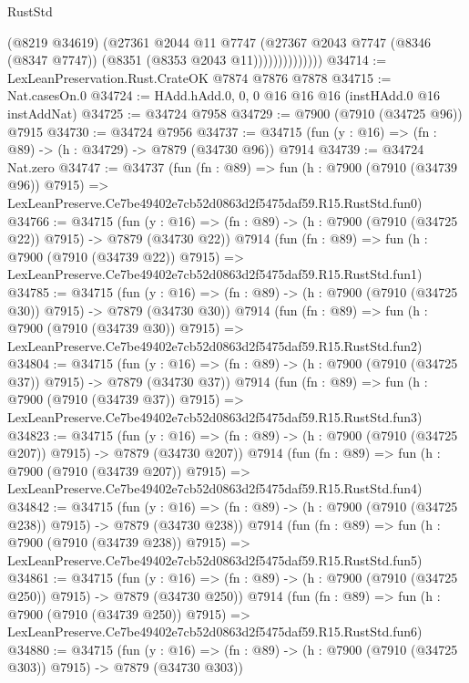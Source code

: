 \begin{lexlean}{RustStd}
\begin{coremodule}
                        (@8219 @34619)
                        (@27361
                          @2044
                          @11
                          @7747
                          (@27367
                            @2043
                            @7747
                            (@8346 (@8347 @7747))
                            (@8351 (@8353 @2043 @11))))))))))))))
@34714 := LexLeanPreservation.Rust.CrateOK @7874 @7876 @7878
@34715 := Nat.casesOn.{0}
@34724 := HAdd.hAdd.{0, 0, 0} @16 @16 @16 (instHAdd.{0} @16 instAddNat)
@34725 := @34724 @7958
@34729 := @7900 (@7910 (@34725 @96)) @7915
@34730 := @34724 @7956
@34737 := @34715 (fun (y : @16) => (fn : @89) -> (h : @34729) -> @7879 (@34730 @96)) @7914
@34739 := @34724 Nat.zero
@34747 := @34737
    (fun (fn : @89) =>
    fun (h : @7900 (@7910 (@34739 @96)) @7915) =>
    LexLeanPreserve.Ce7be49402e7cb52d0863d2f5475daf59.R15.RustStd.fun0)
@34766 := @34715
    (fun (y : @16) => (fn : @89) -> (h : @7900 (@7910 (@34725 @22)) @7915) -> @7879 (@34730 @22))
    @7914
    (fun (fn : @89) =>
    fun (h : @7900 (@7910 (@34739 @22)) @7915) =>
    LexLeanPreserve.Ce7be49402e7cb52d0863d2f5475daf59.R15.RustStd.fun1)
@34785 := @34715
    (fun (y : @16) => (fn : @89) -> (h : @7900 (@7910 (@34725 @30)) @7915) -> @7879 (@34730 @30))
    @7914
    (fun (fn : @89) =>
    fun (h : @7900 (@7910 (@34739 @30)) @7915) =>
    LexLeanPreserve.Ce7be49402e7cb52d0863d2f5475daf59.R15.RustStd.fun2)
@34804 := @34715
    (fun (y : @16) => (fn : @89) -> (h : @7900 (@7910 (@34725 @37)) @7915) -> @7879 (@34730 @37))
    @7914
    (fun (fn : @89) =>
    fun (h : @7900 (@7910 (@34739 @37)) @7915) =>
    LexLeanPreserve.Ce7be49402e7cb52d0863d2f5475daf59.R15.RustStd.fun3)
@34823 := @34715
    (fun (y : @16) => (fn : @89) -> (h : @7900 (@7910 (@34725 @207)) @7915) -> @7879 (@34730 @207))
    @7914
    (fun (fn : @89) =>
    fun (h : @7900 (@7910 (@34739 @207)) @7915) =>
    LexLeanPreserve.Ce7be49402e7cb52d0863d2f5475daf59.R15.RustStd.fun4)
@34842 := @34715
    (fun (y : @16) => (fn : @89) -> (h : @7900 (@7910 (@34725 @238)) @7915) -> @7879 (@34730 @238))
    @7914
    (fun (fn : @89) =>
    fun (h : @7900 (@7910 (@34739 @238)) @7915) =>
    LexLeanPreserve.Ce7be49402e7cb52d0863d2f5475daf59.R15.RustStd.fun5)
@34861 := @34715
    (fun (y : @16) => (fn : @89) -> (h : @7900 (@7910 (@34725 @250)) @7915) -> @7879 (@34730 @250))
    @7914
    (fun (fn : @89) =>
    fun (h : @7900 (@7910 (@34739 @250)) @7915) =>
    LexLeanPreserve.Ce7be49402e7cb52d0863d2f5475daf59.R15.RustStd.fun6)
@34880 := @34715
    (fun (y : @16) => (fn : @89) -> (h : @7900 (@7910 (@34725 @303)) @7915) -> @7879 (@34730 @303))

\end{coremodule}
\end{lexlean}
